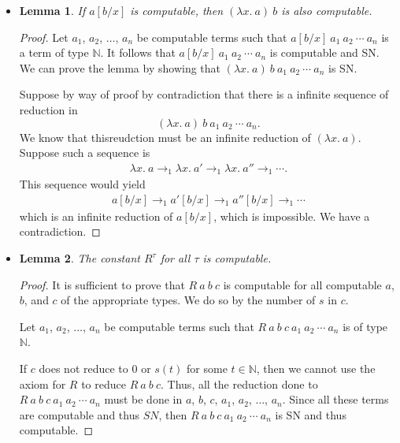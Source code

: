 \documentclass[10pt]{article}
\newtheorem{lemma}{Lemma}[section]
\begin{document}
\begin{itemize}
      \item \begin{lemma}
        If $a[b/x]$ is computable, then $(\lambda x.\ a)\ b$
        is also computable.
      \end{lemma}
      
      \begin{proof}
        Let $a_1$, $a_2$, $\dotsc$, $a_n$ be computable terms
        such that $a[b/x]\ a_1\ a_2\ \dotsb\ a_n$
        is a term of type $\mathbb{N}$. It follows that
        $a[b/x]\ a_1\ a_2\ \dotsb\ a_n$ is computable and SN.
        We can prove the lemma by showing that 
        $(\lambda x.\ a)\ b\ a_1\ a_2\ \dotsb\ a_n$ is SN.
        
        Suppose by way of proof by contradiction that there is a infinite 
        sequence of reduction in $$(\lambda x.\ a)\ b\ a_1\ a_2\ \dotsb\ a_n.$$
        We know that thisreudction must be an infinite reduction of
        $(\lambda x.\ a)$. Suppose such a sequence is
        \begin{align*}
          \lambda x.\ a \rightarrow_1 \lambda x.\ a' \rightarrow_1 \lambda x.\ a'' \rightarrow_1 \dotsb.
        \end{align*}
        This sequence would yield
        \begin{align*}
          a[b/x] \rightarrow_1 a'[b/x] \rightarrow_1 a''[b/x] \rightarrow_1 \dotsb
        \end{align*}
        which is an infinite reduction of $a[b/x]$, which is impossible. We have a contradiction.
      \end{proof}
      
      \item \begin{lemma}
        The constant $R^\tau$ for all $\tau$ is computable.
      \end{lemma}
      \begin{proof}
        It is sufficient to prove that $R\ a\ b\ c$ is computable for all computable
        $a$, $b$, and $c$ of the appropriate types. We do so by the number of $s$ in $c$.
        
        Let $a_1$, $a_2$, $\dotsc$, $a_n$ be computable terms such that
        $R\ a\ b\ c\ a_1\ a_2\ \dotsb\ a_n$ is of type $\mathbb{N}$.
        
        If $c$ does not reduce to $0$ or $s(t)$ for some $t \in \mathbb{N}$, then
        we cannot use the axiom for $R$ to reduce $R\ a\ b\ c$.
        Thus, all the reduction done to $R\ a\ b\ c\ a_1\ a_2\ \dotsb\ a_n$
        must be done in $a$, $b$, $c$, $a_1$, $a_2$, $\dotsc$, $a_n$. Since 
        all these terms are computable and thus $SN$, then 
        $R\ a\ b\ c\ a_1\ a_2\ \dotsb\ a_n$ is SN and thus computable.
        

\end{proof}
\end{itemize}
\end{document}
